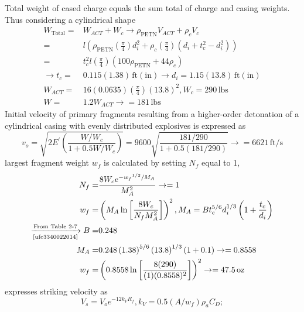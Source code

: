 \documentclass[]{article} %
\begin{document}
Total weight of cased charge equals the sum total of charge and casing weights. Thus considering a cylindrical shape
\begin{equation}\nonumber\begin{aligned}
W_\mathrm{Total}=&W_{ACT}+W_c\rightarrow \rho_\mathrm{PETN}V_{ACT}+\rho_cV_c\\
=&l\left(\rho_\mathrm{PETN}\left(\frac{\pi}{4}\right)d_i^2+\rho_c\left(\frac{\pi}{4}\right)\left(d_i+t_c^2-d_i^2\right)\right)\\
=&t_c^2l\left(\frac{\pi}{4}\right)\left(100\rho_\mathrm{PETN}+44\rho_c\right)\\
\rightarrow t_c=&0.115(1.38)\, \mathrm{ft(in)}\rightarrow d_i = 1.15(13.8)\, \mathrm{ft(in)}\\
W_{ACT}=&16(0.0635)\left(\frac{\pi}{4}\right)\left(13.8\right)^2, W_c=290\,\mathrm{lbs}\\
W=&1.2W_{ACT}\rightarrow=181\,\mathrm{lbs}
\end{aligned}
\end{equation}
Initial velocity of primary fragments resulting from a higher-order detonation of a cylindrical casing with evenly distributed explosives is expressed as\citep{ufc3340022014}
\begin{equation}\nonumber
v_o= \sqrt{2E^\prime\left(\frac{W/W_c}{1+0.5W/W_c}\right)}=9600\sqrt{\frac{181/290}{1+0.5\left(181/290\right)}}\rightarrow=6621\,\mathrm{ft/s}
\end{equation}
largest fragment weight $w_f$ is calculated by setting $N_f$ equal to 1,
\begin{equation}\nonumber
\begin{aligned}
N_f=&\frac{8W_ce^{-{w_f}^{1/2}/M_A}}{M^2_A}\rightarrow=1\\
w_f=&\left(M_A\ln\left[\frac{8W_c}{N_fM_A^2}\right]\right)^2, M_A=Bt_c^{5/6}d^{1/3}_i\left(1+\frac{t_c}{d_i}\right)\\
\xrightarrow[\text{\cite{ufc3340022014}}]{\text{From Table 2-7}} B=&0.248\\
M_A=&0.248\left(1.38\right)^{5/6}\left(13.8\right)^{1/3}(1+0.1)\rightarrow=0.8558\\
w_f=&\left(0.8558\ln{\left[\frac{8(290)}{(1)(0.8558)^2}\right]}\right)^2\rightarrow=47.5\,\mathrm{oz}
\end{aligned}
\end{equation}
\cite{ufc3340022014} expresses striking velocity as
\begin{equation}\nonumber
V_s=V_oe^{-12k_VR_f}, k_V=0.5(A/w_f)\rho_aC_D;
\end{equation}
\end{document}
